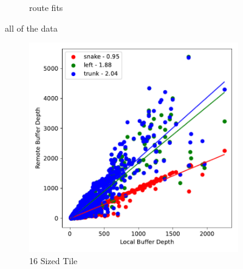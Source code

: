 \begin{figure}
\begin{subfigure}[b]{0.475\textwidth}
      \caption[]%
      {{\small route fits}}    
  \end{subfigure}
  \caption[ Information on the 4 by 4 tile. ]
  {\small all of the data } 
  \label{fig:mp60_fast_plots_for_digital_sim}
\end{figure}

\begin{figure}
  \centering
  \begin{subfigure}[b]{0.475\textwidth}
      \centering
      \includegraphics[width=\textwidth]{./images/mp60_16_slow_route_fits.pdf}
      \caption[]%
      {\small 16 Sized Tile}    
  \end{subfigure}
  \hfill
  \begin{subfigure}[b]{0.475\textwidth}  
      \centering 

\end{subfigure}
\end{figure}
